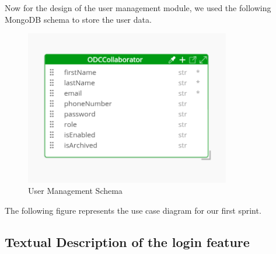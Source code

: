 Now for the design of the user management module, we used the following MongoDB schema to store the user data.

\begin{figure}[htp!]
  \centering
  \includegraphics[width=0.8\textwidth]{images/diagram-ODCCollaborator.png}
  \caption{User Management Schema}
\end{figure}

The following figure represents the use case diagram for our first sprint.

\subsection{Textual Description of the login feature}

